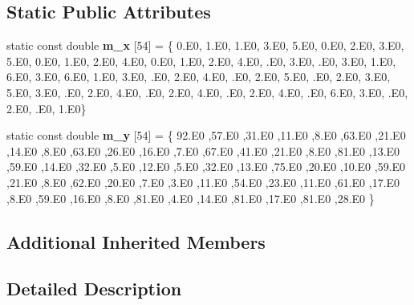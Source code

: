 \subsection*{Static Public Attributes}
\begin{DoxyCompactItemize}
\item 
\mbox{\label{structchwirut2__functor_aefe29b3f762ebc54b04395db1a455836}} 
static const double {\bfseries m\+\_\+x} \mbox{[}54\mbox{]} = \{ 0.\+E0, 1.\+E0, 1.\+E0, 3.\+E0, 5.\+E0, 0.\+E0, 2.\+E0, 3.\+E0, 5.\+E0, 0.\+E0, 1.\+E0, 2.\+E0, 4.\+E0, 0.\+E0, 1.\+E0, 2.\+E0, 4.\+E0, .\+E0, 3.\+E0, .\+E0, 3.\+E0, 1.\+E0, 6.\+E0, 3.\+E0, 6.\+E0, 1.\+E0, 3.\+E0, .\+E0, 2.\+E0, 4.\+E0, .\+E0, 2.\+E0, 5.\+E0, .\+E0, 2.\+E0, 3.\+E0, 5.\+E0, 3.\+E0, .\+E0, 2.\+E0, 4.\+E0, .\+E0, 2.\+E0, 4.\+E0, .\+E0, 2.\+E0, 4.\+E0, .\+E0, 6.\+E0, 3.\+E0, .\+E0, 2.\+E0, .\+E0, 1.\+E0\}
\item 
\mbox{\label{structchwirut2__functor_abe076c6bfd84b15633224817bf748b61}} 
static const double {\bfseries m\+\_\+y} \mbox{[}54\mbox{]} = \{ 92.\+E0 ,57.\+E0 ,31.\+E0 ,11.\+E0 ,8.\+E0 ,63.\+E0 ,21.\+E0 ,14.\+E0 ,8.\+E0 ,63.\+E0 ,26.\+E0 ,16.\+E0 ,7.\+E0 ,67.\+E0 ,41.\+E0 ,21.\+E0 ,8.\+E0 ,81.\+E0 ,13.\+E0 ,59.\+E0 ,14.\+E0 ,32.\+E0 ,5.\+E0 ,12.\+E0 ,5.\+E0 ,32.\+E0 ,13.\+E0 ,75.\+E0 ,20.\+E0 ,10.\+E0 ,59.\+E0 ,21.\+E0 ,8.\+E0 ,62.\+E0 ,20.\+E0 ,7.\+E0 ,3.\+E0 ,11.\+E0 ,54.\+E0 ,23.\+E0 ,11.\+E0 ,61.\+E0 ,17.\+E0 ,8.\+E0 ,59.\+E0 ,16.\+E0 ,8.\+E0 ,81.\+E0 ,4.\+E0 ,14.\+E0 ,81.\+E0 ,17.\+E0 ,81.\+E0 ,28.\+E0 \}
\end{DoxyCompactItemize}
\subsection*{Additional Inherited Members}


\subsection{Detailed Description}


